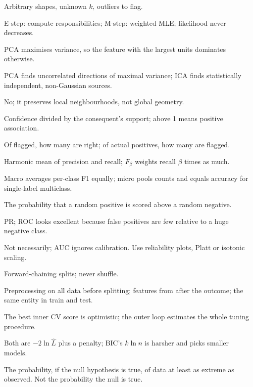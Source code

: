 {	 Arbitrary shapes, unknown $k$, outliers to flag.

	 E-step: compute responsibilities; M-step: weighted MLE; likelihood never decreases.

	 PCA maximises variance, so the feature with the largest units dominates otherwise.

	 PCA finds uncorrelated directions of maximal variance; ICA finds statistically independent,
	non-Gaussian sources.

	 No; it preserves local neighbourhoods, not global geometry.

	 Confidence divided by the consequent's support; above 1 means positive association.

	 Of flagged, how many are right; of actual positives, how many are flagged.

	 Harmonic mean of precision and recall; $F_\beta$ weights recall $\beta$ times as much.

	 Macro averages per-class F1 equally; micro pools counts and equals accuracy for
	single-label multiclass.

	 The probability that a random positive is scored above a random negative.

	 PR; ROC looks excellent because false positives are few relative to a huge
	negative class.

	 Not necessarily; AUC ignores calibration. Use reliability plots, Platt or
	isotonic scaling.

	 Forward-chaining splits; never shuffle.

	 Preprocessing on all data before splitting; features from after the outcome;
	the same entity in train and test.

	 The best inner CV score is optimistic; the outer loop estimates the whole tuning procedure.

	 Both are $-2\ln\hat L$ plus a penalty; BIC's $k\ln n$ is harsher and picks smaller models.

	 The probability, if the null hypothesis is true, of data at least as extreme as observed.
	Not the probability the null is true.

}

